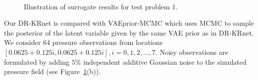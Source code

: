 \begin{figure}
	\centering
	\quad
	\\
	\quad
	\caption{Illustration of surrogate results for test problem 1.}
    \label{surrogate_plot}
\end{figure}

Our DR-KRnet is compared with VAEprior-MCMC    
which uses MCMC to sample the posterior of the latent variable given by the same VAE prior as in DR-KRnet. We consider 64 pressure observations from locations $[0.0625 + 0.125i, 0.0625 +
0.125i],i = 0, 1, 2,\dots, 7$. 
Noisy observations are formulated by adding $5\%$ independent additive Gaussian noise to the simulated pressure field (see Figure\ \ref{surrogate_plot}(b)).

